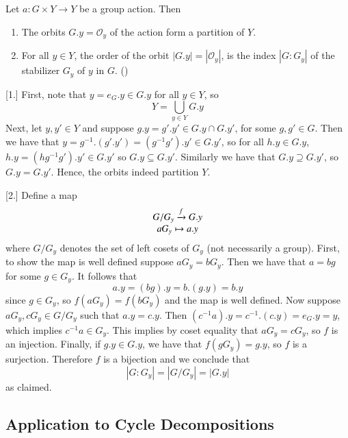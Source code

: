 \documentclass[12pt, a4paper, twoside, openright, titlepage]{book}
\begin{document}
\begin{lem}{}{}
        Let $a:G\times Y \rightarrow Y$ be a group action. Then \begin{enumerate}
                \item The orbits $G.y = \mathcal{O}_y$ of the action form a partition of $Y$.
                \item For all $y \in Y$, the order of the orbit $|G.y| = |\mathcal{O}_y|$, is the index $|G:G_y|$ of the stabilizer $G_y$ of $y$ in $G$. ()
        \end{enumerate}
\end{lem}
\begin{proof*}{}{}
        [1.] First, note that $y = e_G.y \in G.y$ for all $y \in Y$, so \begin{equation}
                Y = \bigcup_{y \in Y}G.y
        \end{equation}
        Next, let $y,y' \in Y$ and suppose $g.y = g'.y' \in G.y \cap G.y'$, for some $g,g' \in G$. Then we have that $y = g^{-1}.(g'.y') = (g^{-1}g').y' \in G.y'$, so for all $h.y \in G.y$, $h.y = (hg^{-1}g').y' \in G.y'$ so $G.y \subseteq G.y'$. Similarly we have that $G.y \supseteq G.y'$, so $G.y = G.y'$. Hence, the orbits indeed partition $Y$.


        [2.] Define a map \begin{equation}
                \begin{array}{c} G/G_y\xrightarrow{f} G.y \\ aG_y\mapsto a.y \end{array}
        \end{equation}
        where $G/G_y$ denotes the set of left cosets of $G_y$ (not necessarily a group). First, to show the map is well defined suppose $aG_y = bG_y$. Then we have that $a = bg$ for some $g \in G_y$. It follows that $$a.y = (bg).y = b.(g.y) = b.y$$ since $g \in G_y$, so $f(aG_y) = f(bG_y)$ and the map is well defined. Now suppose $aG_y, cG_y \in G/G_y$ such that $a.y = c.y$. Then $(c^{-1}a).y = c^{-1}.(c.y) = e_G.y = y$, which implies $c^{-1}a \in G_y$. This implies by coset equality that $aG_y = cG_y$, so $f$ is an injection. Finally, if $g.y \in G.y$, we have that $f(gG_y) = g.y$, so $f$ is a surjection. Therefore $f$ is a bijection and we conclude that \begin{equation}
                |G:G_y| = |G/G_y| = |G.y|
        \end{equation}
        as claimed.
\end{proof*}


\subsection{\textsection Application to Cycle Decompositions}
\end{document}
